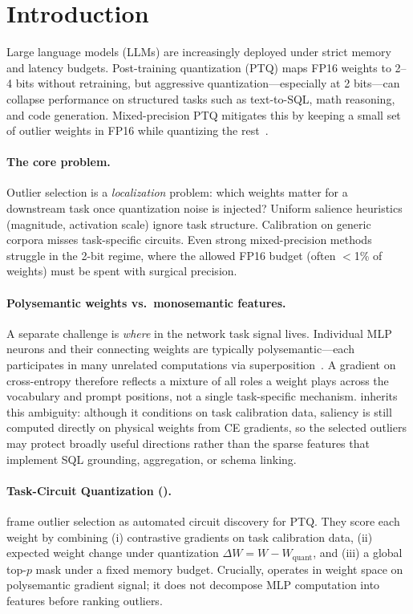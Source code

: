 \section{Introduction}
\label{sec:intro}

Large language models (LLMs) are increasingly deployed under strict memory and
latency budgets. Post-training quantization (PTQ) maps FP16 weights to 2--4
bits without retraining, but aggressive quantization---especially at 2
bits---can collapse performance on structured tasks such as text-to-SQL, math
reasoning, and code generation. Mixed-precision PTQ mitigates this by keeping a
small set of outlier weights in FP16 while quantizing the
rest~\citep{dettmers2022llmint8,frantar2023gptq,dettmers2023spqr}.

\paragraph{The core problem.}
Outlier selection is a \emph{localization} problem: which weights matter for a
downstream task once quantization noise is injected? Uniform salience
heuristics (magnitude, activation scale) ignore task structure. Calibration on
generic corpora misses task-specific circuits. Even strong mixed-precision
methods struggle in the 2-bit regime, where the allowed FP16 budget (often
$<$1\% of weights) must be spent with surgical precision.

\paragraph{Polysemantic weights vs.\ monosemantic features.}
A separate challenge is \emph{where} in the network task signal lives.
Individual MLP neurons and their connecting weights are typically
polysemantic---each participates in many unrelated computations via
superposition~\citep{elhage2021mathematical,bricken2023monosemanticity}. A
gradient on cross-entropy therefore reflects a mixture of all roles a weight
plays across the vocabulary and prompt positions, not a single task-specific
mechanism. \baseline{} inherits this ambiguity: although it conditions on task
calibration data, saliency is still computed directly on physical weights from
CE gradients, so the selected outliers may protect broadly useful directions
rather than the sparse features that implement SQL grounding, aggregation, or
schema linking.

\paragraph{Task-Circuit Quantization (\baseline{}).}
\citet{xiao2025tacq} frame outlier selection as automated circuit discovery for
PTQ. They score each weight by combining (i) contrastive gradients on task
calibration data, (ii) expected weight change under quantization
$\Delta W = W - W_{\text{quant}}$, and (iii) a global top-$p$ mask under a
fixed memory budget. Crucially, \baseline{} operates in weight space on
polysemantic gradient signal; it does not decompose MLP computation into
features before ranking outliers.

